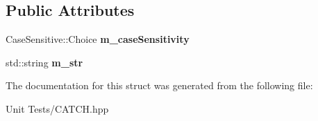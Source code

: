 \subsection*{Public Attributes}
\begin{DoxyCompactItemize}
\item 
Case\+Sensitive\+::\+Choice {\bfseries m\+\_\+case\+Sensitivity}\hypertarget{structCatch_1_1Matchers_1_1Impl_1_1StdString_1_1CasedString_af399ed93051d8981e298206dee6898b3}{}\label{structCatch_1_1Matchers_1_1Impl_1_1StdString_1_1CasedString_af399ed93051d8981e298206dee6898b3}

\item 
std\+::string {\bfseries m\+\_\+str}\hypertarget{structCatch_1_1Matchers_1_1Impl_1_1StdString_1_1CasedString_a9f8ce063a934330ac59bf8638f047e99}{}\label{structCatch_1_1Matchers_1_1Impl_1_1StdString_1_1CasedString_a9f8ce063a934330ac59bf8638f047e99}

\end{DoxyCompactItemize}


The documentation for this struct was generated from the following file\+:\begin{DoxyCompactItemize}
\item 
Unit Tests/C\+A\+T\+C\+H.\+hpp\end{DoxyCompactItemize}
